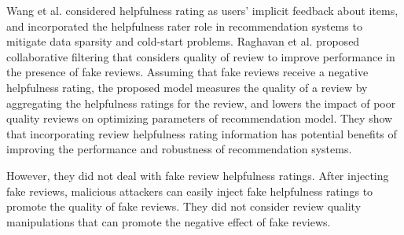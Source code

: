 \documentclass[master,english,final]{kaist-ucs}
\begin{document}
Wang et al. \cite{DualRole} considered helpfulness rating as users’ implicit feedback about items, and  incorporated the helpfulness rater role in recommendation systems to mitigate data sparsity and cold-start problems.
Raghavan et al. \cite{RQMF} proposed collaborative filtering that considers quality of review to improve performance in the presence of fake reviews.
Assuming that fake reviews receive a negative helpfulness rating, the proposed model measures the quality of a review by aggregating the helpfulness ratings for the review, and lowers the impact of poor quality reviews on optimizing parameters of recommendation model.
They show that incorporating review helpfulness rating information has potential benefits of improving the performance and robustness of recommendation systems.

However, they did not deal with fake review helpfulness ratings.
After injecting fake reviews, malicious attackers can easily inject fake helpfulness ratings to promote the quality of fake reviews.
They did not consider review quality manipulations that can promote the negative effect of fake reviews.
\end{document}
